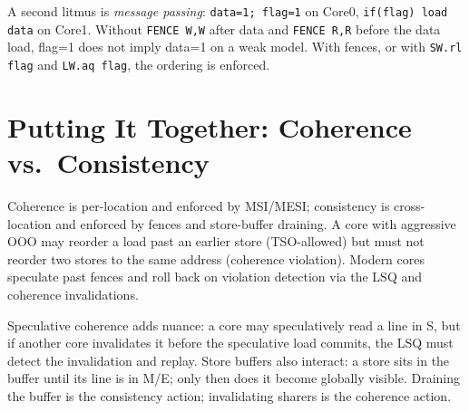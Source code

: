 A second litmus is \textit{message passing}: \texttt{data=1; flag=1} on Core0, \texttt{if(flag) load data} on Core1. Without \texttt{FENCE W,W} after data and \texttt{FENCE R,R} before the data load, flag=1 does not imply data=1 on a weak model. With fences, or with \texttt{SW.rl flag} and \texttt{LW.aq flag}, the ordering is enforced.

\section{Putting It Together: Coherence vs.\ Consistency}
Coherence is per-location and enforced by MSI/MESI; consistency is cross-location and enforced by fences and store-buffer draining. A core with aggressive OOO may reorder a load past an earlier store (TSO-allowed) but must not reorder two stores to the same address (coherence violation). Modern cores speculate past fences and roll back on violation detection via the LSQ and coherence invalidations.

Speculative coherence adds nuance: a core may speculatively read a line in S, but if another core invalidates it before the speculative load commits, the LSQ must detect the invalidation and replay. Store buffers also interact: a store sits in the buffer until its line is in M/E; only then does it become globally visible. Draining the buffer is the consistency action; invalidating sharers is the coherence action.

